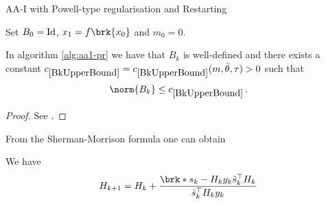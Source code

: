 \begin{frame}
	\begin{algorithm}[H]
	\caption{AA-I with Powell-type regularisation and Restarting}\label{alg:aa1-pr}
	\color{gray}
	\BlankLine
	Set $B_0=\operatorname{Id}$, $x_1=f\brk{x_0}$ and {\black $m_0 = 0$}.
	
	\end{algorithm}
\end{frame}

\begin{frame}
	\begin{lemma}
		In algorithm \ref{alg:aa1-pr} we have that $B_k$ is well-defined and there exists a constant $\useconstant{BkUpperBound}=\useconstant{BkUpperBound}(m,\bartheta,\tau)>0$ such that
		\begin{align*}
			\norm{B_k}\leq \useconstant{BkUpperBound}\,.
		\end{align*}
	\end{lemma}
	\begin{proof}
		See \cite[Lemma 3]{ZhaAA}.
	\end{proof}
\end{frame}

\begin{frame}
	From the Sherman-Morrison formula one can obtain
	\begin{proposition}
		We have
		\begin{align*}
			H_{k+1} = H_k+\frac{\brk*{s_k-H_ky_k}\hs_k^\top H_k}{\hs_k^\top H_ky_k}
		\end{align*}
	\end{proposition}
\end{frame}


